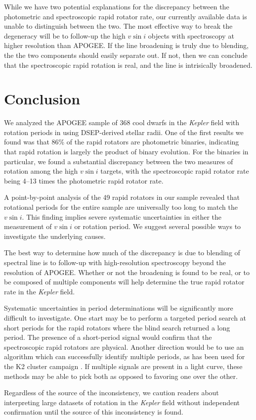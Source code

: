 \documentclass[manuscript]{aastex6}
\newcommand{\vsini}{\ensuremath{v \sin i}}
\newcommand{\Kepler}{\mbox{\textit{Kepler}}}
\begin{document}
While we have two potential explanations for the discrepancy between the
photometric and spectroscopic rapid rotator rate, our currently
available data is unable to distinguish between the two. The most
effective way to break the degeneracy will be to follow-up the high
\vsini{} objects with spectroscopy at higher resolution than APOGEE. If
the line broadening is truly due to blending, the the two components
should easily separate out. If not, then we can conclude that the
spectroscopic rapid rotation is real, and the line is intrisically
broadened.

\section{Conclusion}
\label{sec:conclusions}

We analyzed the APOGEE sample of 368 cool dwarfs in the \Kepler{} field with 
rotation periods in \citet{McQuillan14} using DSEP-derived stellar radii. One
of the first results we found was that 86\% of the rapid rotators are
photometric binaries, indicating that rapid rotation is largely the product of
binary evolution. For the binaries in particular, we
found a substantial discrepancy between the two measures of rotation
among the high \vsini{} targets, with the spectroscopic rapid
rotator rate being 4--13 times the photometric rapid rotator rate. 

A point-by-point analysis of the 49 rapid rotators in our sample revealed that
rotational periods for the entire sample are universally too long to match the 
\vsini{}. This finding implies severe systematic uncertainties in either the
measurement of \vsini{} or rotation period. We suggest several possible ways 
to investigate the underlying causes.

The best way to determine how much of the discrepancy is due to blending of
spectral line is to follow-up with high-resolution spectroscopy beyond the
resolution of APOGEE\@. Whether or not the broadening is found to be real, or to
be composed of multiple components will help determine the true rapid
rotator rate in the \Kepler{} field.

Systematic uncertainties in period determinations will be significantly more
difficult to investigate. One start may be to perform a targeted period search
at short periods for the rapid rotators where the blind search returned a long
period. The presence of a short-period signal would confirm that the
spectroscopic rapid rotators are physical. Another direction would be to use an
algorithm which can successfully identify multiple periods, as has been used
for the K2 cluster campaign \citep{Rebull16,Rebull17}. If multiple signals are
present in a light curve, these methods may be able to pick both as opposed to
favoring one over the other.

Regardless of the source of the inconsistency, we caution readers about 
interpreting large datasets of rotation in the \Kepler{} field without 
independent confirmation until the source of this inconsistency is found.




\end{document}
